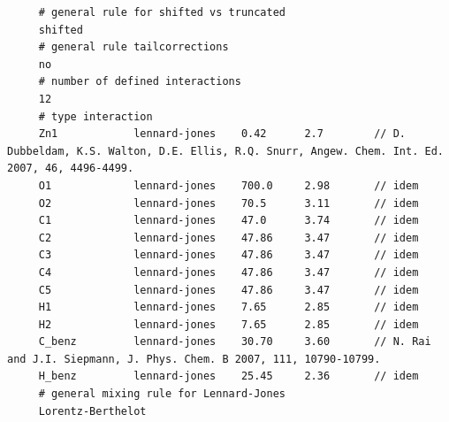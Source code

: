 \begin{tiny}
\begin{verbatim}
     # general rule for shifted vs truncated
     shifted
     # general rule tailcorrections
     no
     # number of defined interactions
     12
     # type interaction
     Zn1            lennard-jones    0.42      2.7        // D. Dubbeldam, K.S. Walton, D.E. Ellis, R.Q. Snurr, Angew. Chem. Int. Ed. 2007, 46, 4496-4499.
     O1             lennard-jones    700.0     2.98       // idem
     O2             lennard-jones    70.5      3.11       // idem
     C1             lennard-jones    47.0      3.74       // idem
     C2             lennard-jones    47.86     3.47       // idem
     C3             lennard-jones    47.86     3.47       // idem
     C4             lennard-jones    47.86     3.47       // idem
     C5             lennard-jones    47.86     3.47       // idem
     H1             lennard-jones    7.65      2.85       // idem
     H2             lennard-jones    7.65      2.85       // idem
     C_benz         lennard-jones    30.70     3.60       // N. Rai and J.I. Siepmann, J. Phys. Chem. B 2007, 111, 10790-10799.
     H_benz         lennard-jones    25.45     2.36       // idem
     # general mixing rule for Lennard-Jones
     Lorentz-Berthelot
\end{verbatim}
\end{tiny}

